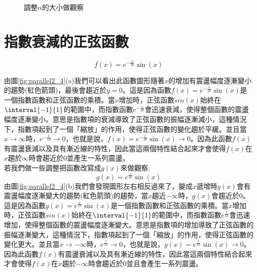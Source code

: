 \documentclass[12pt, a4paper]{article}
\begin{document}
\begin{figure}[h]
\centering
{}
\caption{調整\;$\alpha$\;的大小做觀察}
\label{fig:paralle2_1}
\end{figure}

\section{指數衰減的正弦函數}
\begin{equation}\label{eq:equation_3}
f(x)=e^{-\frac{x}{10}}\sin(x)
\end{equation}

由圖\;\ref{fig:parallel2_4}\;(a)\;我們可以看出此函數圖形隨著\;$x$\;的增加有震盪幅度逐漸變小的趨勢(紅色箭頭)，最後會趨近於\;$y=0$。這是因為函數\;$f(x)=e^{-\frac{x}{10}}\sin(x)$\;是一個指數函數和正弦函數的乘積。當\;$x$\;增加時，正弦函數\;$sin(x)$\;始終在\;$\interval{-1}{1}$\;的範圍中，而指數函數\;$e^{-\frac{x}{10}}$\;會迅速衰減，使得整個函數的震盪幅度逐漸變小。意思是指數項的衰減導致了正弦函數的振幅逐漸減小，這種情況下，指數項起到了一個「縮放」的作用，使得正弦函數的變化趨於平緩。並且當\;$x\rightarrow \infty$\;時，$e^{-\frac{x}{10}}\rightarrow 0$，也就是說，$f(x)=e^{-\frac{x}{10}}\sin(x)\rightarrow0$\;。因為此函數\;$f(x)$\;有震盪衰減以及具有漸近線的特性，因此當這兩個特性結合起來才會使得\;$f(x)$\;在\;$x$\;趨於\;$\infty$\;時會趨近於\;$0$\;並產生一系列震盪。\\
若我們做一些調整把函數改寫成\;$g(x)$\;來做觀察:
\begin{equation}\label{eq:equation_4}
g(x)=e^{\frac{x}{10}}\sin(x)
\end{equation}
由圖\;\ref{fig:parallel2_4}\;(b)\;我們會發現圖形左右相反過來了，變成\;$x$\;遞增時\;$g(x)$\;會有震盪幅度逐漸變大的趨勢(紅色箭頭)的趨勢，當\;$x$\;趨近\;$-\infty$\;時，$g(x)$\;會趨近於\;$0$。\\
這是因為函數\;$g(x)=e^{\frac{x}{10}}\sin(x)$\;是一個指數函數和正弦函數的乘積。當\;$x$\;增加時，正弦函數\;$sin(x)$\;始終在\;$\interval{-1}{1}$\;的範圍中，而指數函數\;$e^{\frac{x}{10}}$\;會迅速增加，使得整個函數的震盪幅度逐漸變大。意思是指數項的增加導致了正弦函數的振幅逐漸變大，這種情況下，指數項起到了一個「縮放」的作用，使得正弦函數的變化更大。並且當\;$x\rightarrow -\infty$\;時，$e^{\frac{x}{10}}\rightarrow 0$，也就是說，$g(x)=e^{\frac{x}{10}}\sin(x)\rightarrow0$\;。因為此函數\;$f(x)$\;有震盪衰減以及具有漸近線的特性，因此當這兩個特性結合起來才會使得\;$f(x)$\;在\;$x$\;趨於\;$- \infty$\;時會趨近於\;$0$\;並且會產生一系列震盪。
\end{document}
